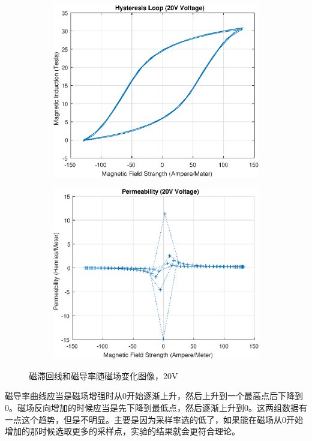 \documentclass{ctexart}
\begin{document}
\begin{figure}[H]
  \centering
  \begin{subfigure}{0.48\linewidth}
    \includegraphics[width=\linewidth]{LabVIEW使用基础/数据处理/HysteresisLoop_20V.eps}
  \end{subfigure}
  \begin{subfigure}{0.48\linewidth}
    \includegraphics[width=\linewidth]{LabVIEW使用基础/数据处理/Permeability_20V.eps}
  \end{subfigure}
  \caption{磁滞回线和磁导率随磁场变化图像，20V}
\end{figure}

磁导率曲线应当是磁场增强时从0开始逐渐上升，然后上升到一个最高点后下降到0。磁场反向增加的时候应当是先下降到最低点，然后逐渐上升到0。这两组数据有一点这个趋势，但是不明显。主要是因为采样率选的低了，如果能在磁场从0开始增加的那时候选取更多的采样点，实验的结果就会更符合理论。
\end{document}
